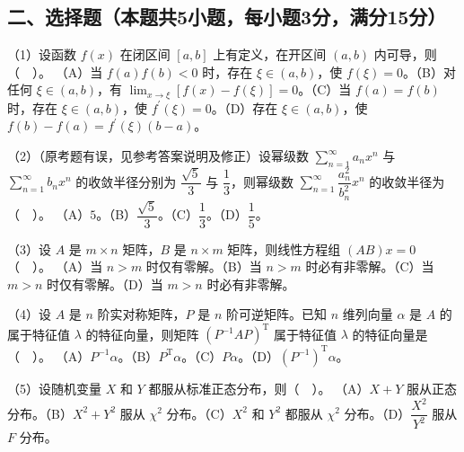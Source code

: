 \documentclass[UTF8,12pt]{ctexart}
\begin{document}
\subsection*{二、选择题（本题共5小题，每小题3分，满分15分）}

（1）设函数 \(\displaystyle f(x)\) 在闭区间 \(\displaystyle [a,\allowbreak b]\) 上有定义，在开区间 \(\displaystyle (a,\allowbreak b)\) 内可导，则（　）。
（A）当 \(\displaystyle f(a)f(b)<0\) 时，存在 \(\displaystyle \xi\in(a,\allowbreak b)\)，使 \(\displaystyle f(\xi)=0\)。（B）对任何 \(\displaystyle \xi\in(a,\allowbreak b)\)，有 \(\displaystyle \lim_{x\to\xi}[f(x)-f(\xi)]=0\)。（C）当 \(\displaystyle f(a)=f(b)\) 时，存在 \(\displaystyle \xi\in(a,\allowbreak b)\)，使 \(\displaystyle f^{\prime}(\xi)=0\)。（D）存在 \(\displaystyle \xi\in(a,\allowbreak b)\)，使 \(\displaystyle f(b)-f(a)=f^{\prime}(\xi)(b-a)\)。


（2）（原考题有误，见参考答案说明及修正）设幂级数 \(\displaystyle \sum_{n=1}^{\infty}a_nx^n\) 与 \(\displaystyle \sum_{n=1}^{\infty}b_nx^n\) 的收敛半径分别为 \(\displaystyle \dfrac{\displaystyle \sqrt5}{\displaystyle 3}\) 与 \(\displaystyle \dfrac{\displaystyle 1}{\displaystyle 3}\)，则幂级数 \(\displaystyle \sum_{n=1}^{\infty}\dfrac{\displaystyle a_n^2}{\displaystyle b_n^2}x^n\) 的收敛半径为（　）。
（A）\(\displaystyle 5\)。（B）\(\displaystyle \dfrac{\displaystyle \sqrt5}{\displaystyle 3}\)。（C）\(\displaystyle \dfrac{\displaystyle 1}{\displaystyle 3}\)。（D）\(\displaystyle \dfrac{\displaystyle 1}{\displaystyle 5}\)。


（3）设 \(\displaystyle A\) 是 \(\displaystyle m\times n\) 矩阵，\(\displaystyle B\) 是 \(\displaystyle n\times m\) 矩阵，则线性方程组 \(\displaystyle (AB)x=0\)（　）。
（A）当 \(\displaystyle n>m\) 时仅有零解。（B）当 \(\displaystyle n>m\) 时必有非零解。（C）当 \(\displaystyle m>n\) 时仅有零解。（D）当 \(\displaystyle m>n\) 时必有非零解。


（4）设 \(\displaystyle A\) 是 \(\displaystyle n\) 阶实对称矩阵，\(\displaystyle P\) 是 \(\displaystyle n\) 阶可逆矩阵。已知 \(\displaystyle n\) 维列向量 \(\displaystyle \alpha\) 是 \(\displaystyle A\) 的属于特征值 \(\displaystyle \lambda\) 的特征向量，则矩阵 \(\displaystyle (P^{-1}AP)^{\mathrm T}\) 属于特征值 \(\displaystyle \lambda\) 的特征向量是（　）。
（A）\(\displaystyle P^{-1}\alpha\)。（B）\(\displaystyle P^{\mathrm T}\alpha\)。（C）\(\displaystyle P\alpha\)。（D）\(\displaystyle (P^{-1})^{\mathrm T}\alpha\)。


（5）设随机变量 \(\displaystyle X\) 和 \(\displaystyle Y\) 都服从标准正态分布，则（　）。
（A）\(\displaystyle X+Y\) 服从正态分布。（B）\(\displaystyle X^2+Y^2\) 服从 \(\displaystyle \chi^2\) 分布。（C）\(\displaystyle X^2\) 和 \(\displaystyle Y^2\) 都服从 \(\displaystyle \chi^2\) 分布。（D）\(\displaystyle \dfrac{\displaystyle X^2}{\displaystyle Y^2}\) 服从 \(\displaystyle F\) 分布。
\end{document}
